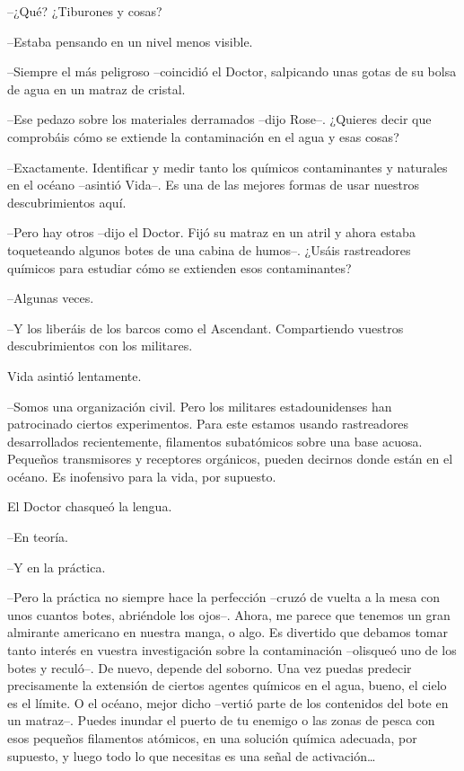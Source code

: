 {--¿Qué? ¿Tiburones y cosas?}

{--Estaba pensando en un nivel menos visible.}

{--Siempre el más peligroso --coincidió el Doctor, salpicando unas gotas
de su bolsa de agua en un matraz de cristal.}

{--Ese pedazo sobre los materiales derramados --dijo Rose--. ¿Quieres
 decir que comprobáis cómo se extiende la contaminación en el agua y esas
cosas?}

{--Exactamente. Identificar y medir tanto los químicos contaminantes y
 naturales en el océano --asintió Vida--. Es una de las mejores formas de
usar nuestros descubrimientos aquí.}

{--Pero hay otros --dijo el Doctor. Fijó su matraz en un atril y ahora
 estaba toqueteando algunos botes de una cabina de humos--. ¿Usáis
 rastreadores químicos para estudiar cómo se extienden esos
contaminantes?}

{--Algunas veces.}

{--Y los liberáis de los barcos como el Ascendant. Compartiendo vuestros
descubrimientos con los militares.}

{Vida asintió lentamente.}

{--Somos una organización civil. Pero los militares estadounidenses han
 patrocinado ciertos experimentos. Para este estamos usando rastreadores
 desarrollados recientemente, filamentos subatómicos sobre una base
 acuosa. Pequeños transmisores y receptores orgánicos, pueden decirnos
donde están en el océano. Es inofensivo para la vida, por supuesto.}

{El Doctor chasqueó la lengua.}

{--En teoría.}

{--Y en la práctica.}

{--Pero la práctica no siempre hace la perfección --cruzó de vuelta a la
 mesa con unos cuantos botes, abriéndole los ojos--. Ahora, me parece que
 tenemos un gran almirante americano en nuestra manga, o algo. Es
 divertido que debamos tomar tanto interés en vuestra investigación sobre
 la contaminación --olisqueó uno de los botes y reculó--. De nuevo,
 depende del soborno. Una vez puedas predecir precisamente la extensión
 de ciertos agentes químicos en el agua, bueno, el cielo es el límite. O
 el océano, mejor dicho --vertió parte de los contenidos del bote en un
 matraz--. Puedes inundar el puerto de tu enemigo o las zonas de pesca
 con esos pequeños filamentos atómicos, en una solución química adecuada,
 por supuesto, y luego todo lo que necesitas es una señal de
 activación\ldots{}}


